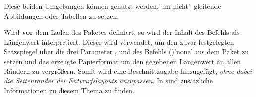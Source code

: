 \begin{Bundle*}{}
\begin{Declaration}{}
\begin{Declaration}{}
\printdeclarationlist%
%
Diese beiden Umgebungen können genutzt werden, um nicht"~gleitende Abbildungen 
oder Tabellen zu setzen.
\end{Declaration}
\end{Declaration}

\begin{Declaration}{}
\printdeclarationlist%
%
Wird  \textbf{vor} dem Laden des Paketes 
definiert, so wird der Inhalt des Befehls als Längenwert interpretiert. Dieser 
wird verwendet, um den zuvor festgelegten Satzspiegel über die drei Parameter
,
 und 
 des
Befehls ()'none' aus dem Paket 
 zu setzen und das erzeugte Papierformat um den gegebenen 
Längenwert an allen Rändern zu vergrößern. Somit wird eine Beschnittzugabe 
hinzugefügt, \emph{ohne dabei die Seitenränder des Entwurfslayouts anzupassen}. 
In  sind zusätzliche Informationen zu diesem Thema zu 
finden.
\end{Declaration}
%
\end{Bundle*}
